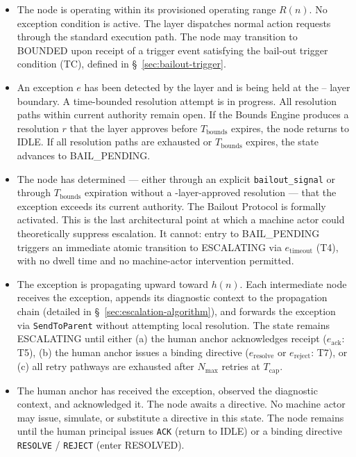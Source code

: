 \begin{itemize}\itemsep=0pt
\item[\textbf{IDLE.}] The node is operating within its provisioned operating range $R(n)$. No exception condition is active. The \fact{} layer dispatches normal action requests through the standard execution path. The node may transition to BOUNDED upon receipt of a trigger event satisfying the bail-out trigger condition (TC), defined in \S~\ref{sec:bailout-trigger}.

\item[\textbf{BOUNDED.}] An exception $e$ has been detected by the \bounds{} layer and is being held at the \bounds{}--\fact{} layer boundary. A time-bounded resolution attempt is in progress. All resolution paths within current authority remain open. If the Bounds Engine produces a resolution $r$ that the \fact{} layer approves before $T_{\text{bounds}}$ expires, the node returns to IDLE. If all resolution paths are exhausted or $T_{\text{bounds}}$ expires, the state advances to BAIL\_PENDING.

\item[\textbf{BAIL\_PENDING.}] The node has determined — either through an explicit \texttt{bailout\_signal} or through $T_{\text{bounds}}$ expiration without a \fact-layer-approved resolution — that the exception exceeds its current authority. The Bailout Protocol is formally activated. This is the last architectural point at which a machine actor could theoretically suppress escalation. It cannot: entry to BAIL\_PENDING triggers an immediate atomic transition to ESCALATING via $e_{\text{timeout}}$ (T4), with no dwell time and no machine-actor intervention permitted.

\item[\textbf{ESCALATING.}] The exception is propagating upward toward $h(n)$. Each intermediate node receives the exception, appends its diagnostic context to the propagation chain (detailed in \S~\ref{sec:escalation-algorithm}), and forwards the exception via \texttt{SendToParent} without attempting local resolution. The state remains ESCALATING until either (a) the human anchor acknowledges receipt ($e_{\text{ack}}$: T5), (b) the human anchor issues a binding directive ($e_{\text{resolve}}$ or $e_{\text{reject}}$: T7), or (c) all retry pathways are exhausted after $N_{\max}$ retries at $T_{\text{cap}}$.

\item[\textbf{HUMAN\_ACKNOWLEDGED.}] The human anchor has received the exception, observed the diagnostic context, and acknowledged it. The node awaits a directive. No machine actor may issue, simulate, or substitute a directive in this state. The node remains until the human principal issues \texttt{ACK} (return to IDLE) or a binding directive \texttt{RESOLVE} / \texttt{REJECT} (enter RESOLVED).


\end{itemize}
